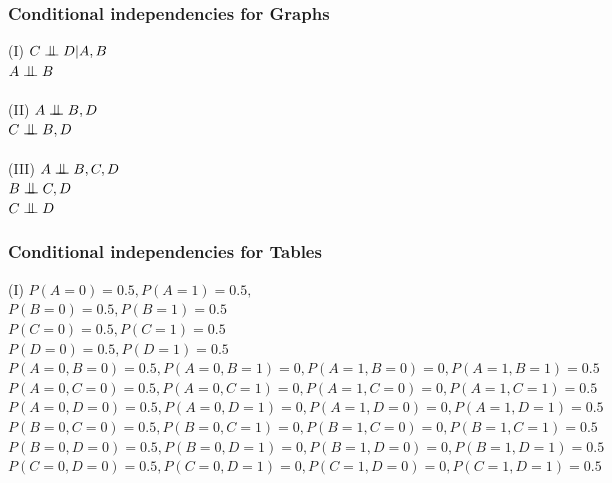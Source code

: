 \documentclass[fleqn]{article}
\newcommand{\bigCI}{\mathrel{\text{\scalebox{1.07}{$\perp\mkern-10mu\perp$}}}}
\begin{document}
\subsubsection*{Conditional independencies for Graphs}
(I) $C \bigCI D | A, B$\\
\hspace*{1em} $A \bigCI B$\\\\
(II) $A \bigCI B, D$\\
\hspace*{1em} $C \bigCI B, D$\\\\
(III) $A \bigCI B, C, D$\\
\hspace*{1em} $B \bigCI C, D$\\
\hspace*{1em} $C \bigCI D$\\

\subsubsection*{Conditional independencies for Tables}

(I)
{
\small $P(A=0) = 0.5, P(A=1) = 0.5, $\\
\hspace*{1em} $P(B=0) = 0.5, P(B=1) = 0.5$\\
\hspace*{1em} $P(C=0) = 0.5, P(C=1) = 0.5$\\
\hspace*{1em} $P(D=0) = 0.5, P(D=1) = 0.5$\\
\hspace*{1em} $P(A=0, B=0) = 0.5, P(A=0, B=1) = 0, P(A=1, B=0) = 0, P(A=1, B=1) = 0.5$\\
\hspace*{1em} $P(A=0, C=0) = 0.5, P(A=0, C=1) = 0, P(A=1, C=0) = 0, P(A=1, C=1) = 0.5$\\
\hspace*{1em} $P(A=0, D=0) = 0.5, P(A=0, D=1) = 0, P(A=1, D=0) = 0, P(A=1, D=1) = 0.5$\\
\hspace*{1em} $P(B=0, C=0) = 0.5, P(B=0, C=1) = 0, P(B=1, C=0) = 0, P(B=1, C=1) = 0.5$\\
\hspace*{1em} $P(B=0, D=0) = 0.5, P(B=0, D=1) = 0, P(B=1, D=0) = 0, P(B=1, D=1) = 0.5$\\
\hspace*{1em} $P(C=0, D=0) = 0.5, P(C=0, D=1) = 0, P(C=1, D=0) = 0, P(C=1, D=1) = 0.5$\\
}
\end{document}
